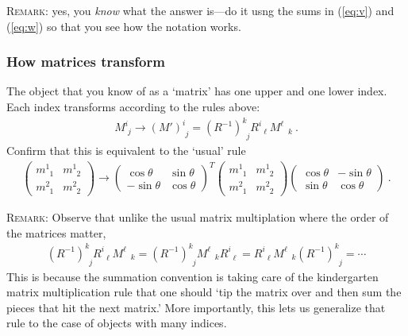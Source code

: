 \documentclass[12pt]{article}
\begin{document}
\textsc{Remark}: yes, you \emph{know} what the answer is---do it usng the sums in (\ref{eq:v}) and (\ref{eq:w}) so that you see how the notation works.

\subsubsection{How matrices transform} 

The object that you know of as a `matrix' has one upper and one lower index. Each index transforms according to the rules above:
\begin{align}
	M^i_{\phantom i j} 
	\to (M')^i_{\phantom{i} j} 
	= (R^{-1})^k_{\phantom{k} j} R^i_{\phantom{i}\ell} M^\ell_{\phantom\ell k} \ .
\end{align}
Confirm that this is equivalent to the `usual' rule
\begin{align}
	\begin{pmatrix}
		m^1_{\phantom 1 1} & m^1_{\phantom 1 2}
		\\
		m^2_{\phantom 2 1} & m^2_{\phantom 2 2}
	\end{pmatrix}
	\to 
	\begin{pmatrix}
		\cos \theta & \sin \theta \\
		-\sin \theta & \cos \theta
	\end{pmatrix}^T
	\begin{pmatrix}
		m^1_{\phantom 1 1} & m^1_{\phantom 1 2}
		\\
		m^2_{\phantom 2 1} & m^2_{\phantom 2 2}
	\end{pmatrix}
	\begin{pmatrix}
		\cos \theta & -\sin \theta \\
		\sin \theta & \cos \theta
	\end{pmatrix} \ .
	\label{eq:rotation:matrix}
\end{align}

\textsc{Remark}: Observe that unlike the usual matrix multiplation where the order of the matrices matter, 
\begin{align*}
(R^{-1})^k_{\phantom{k} j} R^i_{\phantom{i}\ell} M^\ell_{\phantom\ell k}
=
(R^{-1})^k_{\phantom{k} j}  M^\ell_{\phantom\ell k}	R^i_{\phantom{i}\ell}
=
R^i_{\phantom{i}\ell}  M^\ell_{\phantom\ell k} (R^{-1})^k_{\phantom{k} j}
= \cdots
\end{align*}
This is because the summation convention is taking care of the  kindergarten matrix multiplication rule that one should `tip the matrix over and then sum the pieces that hit the next matrix.' More importantly, this lets us generalize that rule to the case of objects with many indices. 
\end{document}
